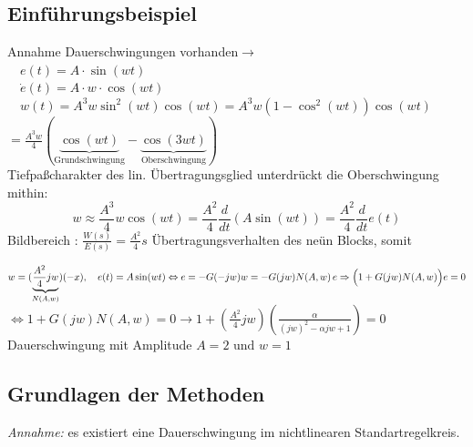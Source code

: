 \documentclass[11pt,a4paper]{article}
\begin{document}
\subsection{Einführungsbeispiel}
\begin{figure}[H] 
  \centering 
  \def\svgwidth{200pt} 
   
\end{figure} 
Annahme Dauerschwingungen vorhanden$\rightarrow $ 
\\$\quad e(t) = A \cdot \sin{(wt)}$
\\$\quad \dot{e}(t)=A\cdot w \cdot \cos(wt) $
\\$\quad w(t) = A^3 w \sin^2 (wt)\cos(wt)= A^3 w (1-\cos^2(wt))\cos(wt)$
									$     = \frac{A^3 w}{4} (\underbrace{\cos(wt)}_{\text{Grundschwingung}} -\underbrace{\cos(3 w t)}_{\text{Oberschwingung}})$
\\ Tiefpaßcharakter des lin. Übertragungsglied unterdrückt die Oberschwingung \\
mithin: \begin{equation*}w\approx \frac{A^3}{4} w\cos(wt) = \frac{A^2}{4} \frac{d}{dt} (A \sin(wt)) = \frac{A^2}{4} \frac{d}{dt}e(t)\end{equation*}
Bildbereich : $\frac{W(s)}{E(s)} = \frac{A^2}{4} s $ Übertragungsverhalten des neün Blocks, somit 
\begin{figure}[H] 
  \centering 
  \def\svgwidth{180pt} 
   
\end{figure} 
$w = (\underbrace{\frac{A^2}{4} jw}_{N(A,w)})(-x),\quad e(t) = A \sin(wt) \\ \Leftrightarrow e = - G(-jw)w  = -G(jw)N(A,w)\,e \Rightarrow \Big(1+G(jw) N(A,w) \Big) e = 0$ \\ $ \Leftrightarrow 1+ G(jw) N(A,w) = 0 \rightarrow 1+ (\frac{A^2}{4} jw) (\frac{\alpha}{(jw)^2 - \alpha jw +1 }) = 0$ \\ Dauerschwingung mit Amplitude $A=2 \text{ und } w=1$ 
\subsection{Grundlagen der Methoden}
\textit{Annahme:} es existiert eine Dauerschwingung im nichtlinearen Standartregelkreis. \\
\end{document}
